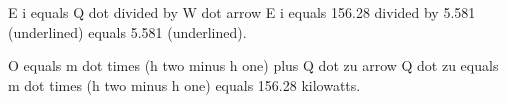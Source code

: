 E i equals Q dot divided by W dot arrow E i equals 156.28 divided by 5.581 (underlined) equals 5.581 (underlined).  

O equals m dot times (h two minus h one) plus Q dot zu arrow Q dot zu equals m dot times (h two minus h one) equals 156.28 kilowatts.